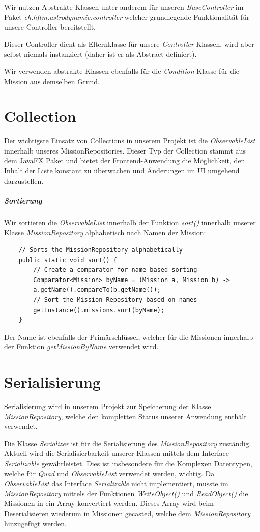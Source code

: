 Wir nutzen Abstrakte Klassen unter anderem für unseren \textit{BaseController} im Paket \textit{ch.hftm.astrodynamic.controller} welcher grundlegende Funktionalität für unsere Controller bereitstellt.

Dieser Controller dient als Elternklasse für unsere \textit{Controller} Klassen, wird aber selbst niemals instanziert (daher ist er als Abstract definiert).

Wir verwenden abstrakte Klassen ebenfalls für die \textit{Condition} Klasse für die Mission aus demselben Grund.

\section{Collection}

Der wichtigste Einsatz von Collections in unserem Projekt ist die \textit{ObservableList} innerhalb unseres MissionRepositories.
Dieser Typ der Collection stammt aus dem JavaFX Paket und bietet der Frontend-Anwendung die Möglichkeit, den Inhalt der Liste konstant zu überwachen und Änderungen im UI umgehend darzustellen.


\subparagraph{Sortierung}

Wir sortieren die \textit{ObservableList} innerhalb der Funktion \textit{sort()} innerhalb unserer Klasse \textit{MissionRepository} alphabetisch nach Namen der Mission:


\begin{lstlisting}
	// Sorts the MissionRepository alphabetically
	public static void sort() {
		// Create a comparator for name based sorting 
		Comparator<Mission> byName = (Mission a, Mission b) ->
		a.getName().compareTo(b.getName());
		// Sort the Mission Repository based on names
		getInstance().missions.sort(byName);
	}
\end{lstlisting}

Der Name ist ebenfalls der Primärschlüssel, welcher für die Missionen innerhalb der Funktion \textit{getMissionByName} verwendet wird.

\section{Serialisierung}

Serialisierung wird in unserem Projekt zur Speicherung der Klasse \textit{MissionRepository}, welche den kompletten Status unserer Anwendung enthält verwendet.

Die Klasse \textit{Serializer} ist für die Serialisierung des \textit{MissionRepository} zuständig.
Aktuell wird die Serialisierbarkeit unserer Klassen mittels dem Interface \textit{Serializable} gewährleistet.
Dies ist insbesondere für die Komplexen Datentypen, welche für \textit{Quad} und \textit{ObservableList} verwendet werden, wichtig.
Da \textit{ObservableList} das Interface \textit{Serializable} nicht implementiert, musste im \textit{MissionRepository} mittels der Funktionen \textit{WriteObject()} und \textit{ReadObject()} die Missionen in ein Array konvertiert werden. Dieses Array wird beim Deserialisieren wiederum in Missionen gecasted, welche dem \textit{MissionRepository} hinzugefügt werden.

